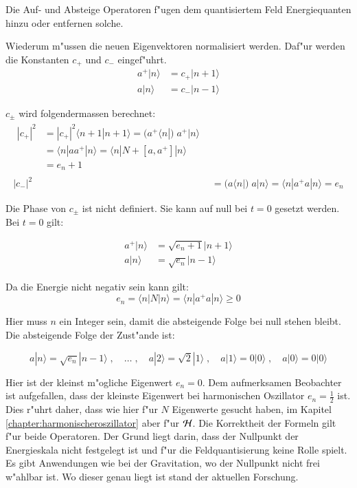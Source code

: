 Die Auf- und Absteige Operatoren f"ugen dem quantisiertem Feld Energiequanten hinzu oder entfernen solche.

Wiederum m"ussen die neuen Eigenvektoren normalisiert werden. Daf"ur werden die Konstanten $c_+$ und $c_-$ eingef"uhrt.
\begin{align*}
a^+|n\rangle &= c_+|n+1\rangle \\
a|n\rangle &= c_-|n-1\rangle
\end{align*}

$c_\pm$ wird folgendermassen berechnet:
\begin{align*}
\begin{split}
	|c_+|^2 &= |c_+|^2 \langle n+1 | n+1 \rangle = ( a^+ \langle n |) \; a^+ | n \rangle \\
		&= \langle n | aa^+ |n \rangle = \langle n | N + [a,a^+] |n \rangle \\
		&= e_n+1
\end{split}\\
	|c_-|^2 &= 	( a \langle n |) \; a | n \rangle = \langle n | a^+a | n \rangle = e_n
\end{align*}

Die Phase von $c_{\pm}$ ist nicht definiert. Sie kann auf null bei $t=0$ gesetzt werden. Bei $t=0$ gilt:

\begin{align*}
a^+|n\rangle &= \sqrt{e_n+1}|n+1\rangle \\
a|n\rangle &= \sqrt{e_n}|n-1\rangle
\end{align*}

Da die Energie nicht negativ sein kann gilt:
\begin{equation*}
e_n = \langle n | N |n \rangle = \langle n | a^+a |n \rangle \geq 0
\end{equation*}

Hier muss $n$ ein Integer sein, damit die absteigende Folge bei null stehen bleibt. Die absteigende Folge der Zust"ande ist:

\begin{equation*}
a|n\rangle = \sqrt{e_n}|n-1\rangle  \;, \quad \hdots \; , \quad a|2\rangle = \sqrt{2}|1\rangle \; , \quad a|1\rangle = 0|0\rangle \;, \quad a|0\rangle = 0|0\rangle
\end{equation*}

Hier ist der kleinst m"ogliche Eigenwert $e_n = 0$. Dem aufmerksamen Beobachter ist aufgefallen, dass der kleinste Eigenwert bei harmonischen Oszillator $e_n = \frac{1}{2}$ ist. Dies r"uhrt daher, dass wie hier f"ur $N$ Eigenwerte gesucht haben, im Kapitel \ref{chapter:harmonischeroszillator} aber f"ur ${\cal H}$. Die Korrektheit der Formeln gilt f"ur beide Operatoren. Der Grund liegt darin, dass der Nullpunkt der Energieskala nicht festgelegt ist und f"ur die Feldquantisierung keine Rolle spielt. Es gibt Anwendungen wie bei der Gravitation, wo der Nullpunkt nicht frei w"ahlbar ist. Wo dieser genau liegt ist stand der aktuellen Forschung.

